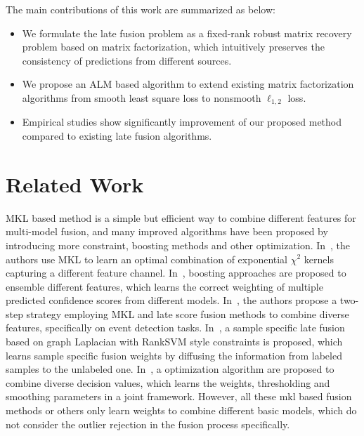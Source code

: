 \documentclass[10pt,twocolumn,letterpaper]{article}
\begin{document}
The main contributions of this work are summarized as below:
\begin{itemize}
  \item We formulate the late fusion problem as a fixed-rank robust matrix recovery problem based on matrix factorization, which intuitively preserves the consistency of predictions from different sources.
  \item We propose an ALM based algorithm to extend existing matrix factorization algorithms from smooth least square loss to nonsmooth $\ell_{1,2}$ loss. 
  \item Empirical studies show significantly improvement of our proposed method compared to existing late fusion algorithms.
\end{itemize}

\section{Related Work}

MKL based method is a simple but efficient way to combine different features for multi-model fusion,
and many improved algorithms have been proposed by introducing more constraint, boosting methods and other optimization.
In~\cite{vedaldi2009multiple}, the authors use MKL to learn an optimal combination of exponential ${\chi}^2$ kernels capturing a different feature channel.
In~\cite{gehler2009feature}, boosting approaches are proposed to ensemble different features, which learns the correct weighting of multiple predicted confidence scores from different models.
In~\cite{natarajan2012multimodal}, the authors propose a two-step strategy employing MKL and late score fusion methods to combine diverse features, specifically on event detection tasks.
In~\cite{lai2015learning}, a sample specific late fusion based on graph Laplacian with RankSVM style constraints is proposed,
which learns sample specific fusion weights by diffusing the information from labeled samples to the unlabeled one.
In~\cite{xuiccv2013feature}, a optimization algorithm are proposed to combine diverse decision values,
which learns the weights, thresholding and smoothing parameters in a joint framework.
However, all these mkl based fusion methods or others only learn weights to combine different basic models, which do not consider the outlier rejection in the fusion process specifically.
\end{document}
